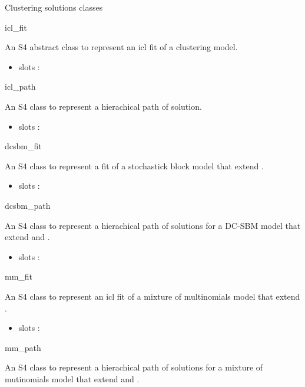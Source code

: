 \documentclass[letterpaper]{book}
\begin{document}
\begin{Description}\relax
Clustering solutions classes

icl\_fit

An S4 abstract class to represent an icl fit of a clustering model.
\begin{itemize}

\item slots : 

\end{itemize}


icl\_path

An S4 class to represent a hierachical path of solution.
\begin{itemize}

\item slots : 

\end{itemize}


dcsbm\_fit

An S4 class to represent a fit of a stochastick block model that extend .
\begin{itemize}

\item slots : 

\end{itemize}


dcsbm\_path

An S4 class to represent a hierachical path of solutions for a DC-SBM model that extend  and .
\begin{itemize}

\item slots : 

\end{itemize}


mm\_fit

An S4 class to represent an icl fit of a mixture of multinomials model that extend .
\begin{itemize}

\item slots : 

\end{itemize}


mm\_path

An S4 class to represent a hierachical path of solutions for a mixture of mutinomials model that extend  and .
\begin{itemize}


\end{itemize}
\end{Description}
\end{document}
